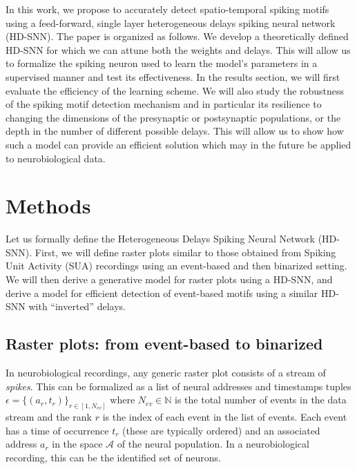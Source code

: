 \documentclass[runningheads]{llncs}
\newcommand{\presynaddr}{a} %
\newcommand{\numevent}{N_{ev}} %
\newcommand{\presynaddrspace}{\mathcal{A}} %
\newcommand{\arank}{r} %
\newcommand{\timev}{t} %
\newcommand{\event}{\epsilon} %
\begin{document}
In this work, we propose to accurately detect spatio-temporal spiking motifs using a feed-forward, single layer heterogeneous delays spiking neural network  (HD-SNN). The paper is organized as follows. We develop a theoretically defined HD-SNN for which we can attune both the weights and delays. %
This will allow us to formalize the spiking neuron used to learn the model's parameters in a supervised manner and test its effectiveness. In the results section, we will first evaluate the efficiency of the learning scheme. We will also study the robustness of the spiking motif detection mechanism and in particular its resilience to changing the dimensions of the presynaptic or postsynaptic populations, or the depth in the number of different possible delays. This will allow us to show how such a model can provide an efficient solution which may in the future be applied to neurobiological data.  %
%
\section{Methods}
\label{sec:methods}
Let us formally define the Heterogeneous Delays Spiking Neural Network (HD-SNN). First, we will define raster plots similar to those obtained from Spiking Unit Activity (SUA) recordings using an event-based and then binarized setting. We will then derive a generative model for raster plots using a HD-SNN, and derive a model for efficient detection of event-based motifs using a similar HD-SNN with ``inverted'' delays.
%
\subsection{Raster plots: from event-based to binarized}
%
In neurobiological recordings, %
any generic raster plot consists of a stream of \emph{spikes}. This can be formalized as a list of neural addresses and timestamps tuples $\event = \{(\presynaddr_\arank, \timev_\arank)\}_{\arank \in [1,\numevent]}$ where $\numevent \in \mathbb{N}$ is the total number of events in the data stream and the rank $\arank$ is the index of each event in the list of events. Each event has a time of occurrence $\timev_\arank$ (these are typically ordered) and an associated address $\presynaddr_\arank$ in the space $\presynaddrspace$ of the neural population. In a neurobiological recording, this can be the identified set of neurons.
\end{document}
